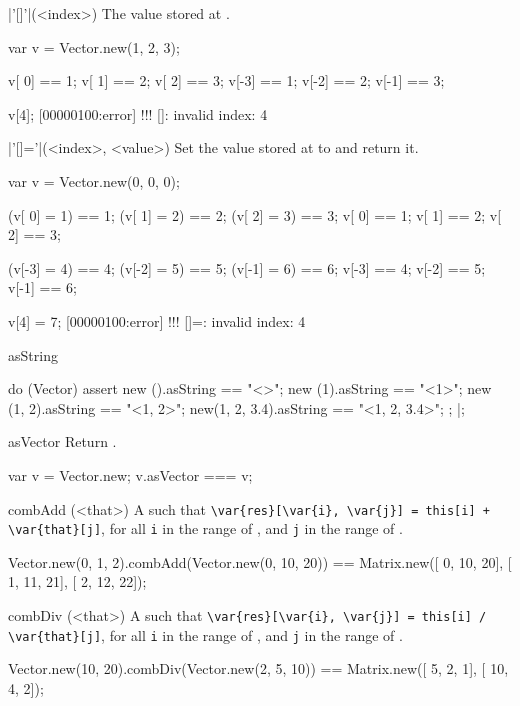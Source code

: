 \begin{urbiscriptapi}
\item|'[]'|(<index>)%
  The value stored at .
\begin{urbiassert}
var v = Vector.new(1, 2, 3);

v[ 0] == 1; v[ 1] == 2; v[ 2] == 3;
v[-3] == 1; v[-2] == 2; v[-1] == 3;

v[4];
[00000100:error] !!! []: invalid index: 4
\end{urbiassert}


\item|'[]='|(<index>, <value>)%
  Set the value stored at  to  and return it.
\begin{urbiassert}
var v = Vector.new(0, 0, 0);

(v[ 0] = 1) == 1; (v[ 1] = 2) == 2; (v[ 2] = 3) == 3;
 v[ 0]      == 1;  v[ 1]      == 2;  v[ 2]      == 3;

(v[-3] = 4) == 4; (v[-2] = 5) == 5; (v[-1] = 6) == 6;
 v[-3]      == 4;  v[-2]      == 5;  v[-1]      == 6;

v[4] = 7;
[00000100:error] !!! []=: invalid index: 4
\end{urbiassert}


\item[asString]%
\begin{urbiscript}
do (Vector)
{
  assert
  {
    new         ().asString == "<>";
    new        (1).asString == "<1>";
    new     (1, 2).asString == "<1, 2>";
    new(1, 2, 3.4).asString == "<1, 2, 3.4>";
  };
}|;
\end{urbiscript}


\item[asVector]%
  Return \this.
\begin{urbiassert}
var v = Vector.new;
v.asVector === v;
\end{urbiassert}


\item[combAdd](<that>)%
  A   such that
  \lstinline|\var{res}[\var{i}, \var{j}] = this[i] + \var{that}[j]|, for all
  \lstinline|i| in the range of \this, and \lstinline|j| in the range of
  \that.
\begin{urbiassert}
Vector.new(0, 1, 2).combAdd(Vector.new(0, 10, 20))
  == Matrix.new([ 0, 10, 20],
                [ 1, 11, 21],
                [ 2, 12, 22]);
\end{urbiassert}


\item[combDiv](<that>)%
  A   such that
  \lstinline|\var{res}[\var{i}, \var{j}] = this[i] / \var{that}[j]|, for all
  \lstinline|i| in the range of \this, and \lstinline|j| in the range of
  \that.
\begin{urbiassert}
Vector.new(10, 20).combDiv(Vector.new(2, 5, 10))
  == Matrix.new([  5, 2, 1],
                [ 10, 4, 2]);
\end{urbiassert}



\end{urbiscriptapi}
